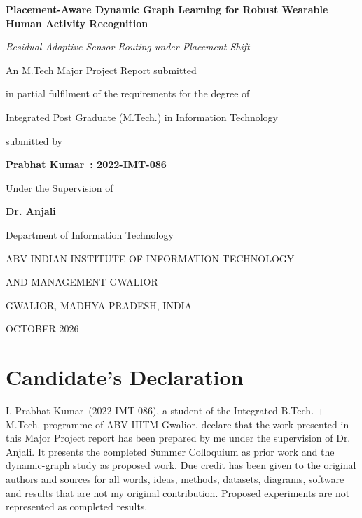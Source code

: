 \documentclass[12pt,a4paper,twoside,openright]{report}
\newcommand{\projecttitle}{Placement-Aware Dynamic Graph Learning for Robust Wearable Human Activity Recognition}
\newcommand{\studentname}{Prabhat Kumar}
\newcommand{\rollnumber}{2022-IMT-086}
\newcommand{\supervisorname}{Dr. Anjali}
\begin{document}

\hypersetup{pageanchor=false}
\begin{titlepage}
\begin{center}
\fontsize{15.8pt}{19pt}\selectfont
\textbf{\projecttitle}

\vspace*{0.13in}
\emph{\large Residual Adaptive Sensor Routing under Placement Shift}

\vspace*{0.35in}
{\large An M.Tech Major Project Report submitted\par}
{\large in partial fulfilment of the requirements for the degree of\par}
{\large Integrated Post Graduate (M.Tech.) in Information Technology\par}

\vspace*{0.4in}
{\large submitted by\par}
{\large\textbf{\studentname\ : \rollnumber}\par}

\vspace*{0.3in}
{\large Under the Supervision of\par}
{\large\textbf{\supervisorname}\par}

\vspace*{0.3in}
{\large Department of Information Technology\par}

\vfill
{\large ABV-INDIAN INSTITUTE OF INFORMATION TECHNOLOGY\par}
{\large AND MANAGEMENT GWALIOR\par}
\vspace*{0.05in}
{\large GWALIOR, MADHYA PRADESH, INDIA\par}
\vspace*{0.05in}
{\large OCTOBER 2026\par}
\end{center}
\end{titlepage}

\cleardoublepage
\hypersetup{pageanchor=true}
\setcounter{page}{1}

\chapter*{Candidate's Declaration}
\vspace{0.5cm}
\noindent
I, \studentname\ (\rollnumber), a student of the Integrated B.Tech. + M.Tech. programme of ABV-IIITM Gwalior, declare that the work presented in this Major Project report has been prepared by me under the supervision of \supervisorname. It presents the completed Summer Colloquium as prior work and the dynamic-graph study as proposed work. Due credit has been given to the original authors and sources for all words, ideas, methods, datasets, diagrams, software and results that are not my original contribution. Proposed experiments are not represented as completed results.
\end{document}
